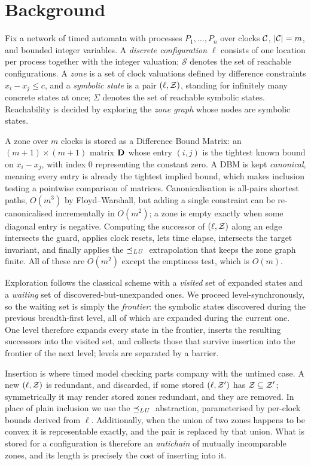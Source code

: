 \section{Background}\label{sec:bg}

Fix a network of timed automata with processes $P_1,\dots,P_n$ over clocks $\mathcal{C}$,
$|\mathcal{C}| = m$, and bounded integer variables. A \emph{discrete configuration} $\ell$
consists of one location per process together with the integer valuation; $\mathcal{S}$
denotes the set of reachable configurations. A \emph{zone} is a set of clock valuations
defined by difference constraints $x_i - x_j \le c$, and a \emph{symbolic state} is a pair
$(\ell,\mathcal{Z})$, standing for infinitely many concrete states at once; $\Sigma$ denotes the set
of reachable symbolic states. Reachability is decided by exploring the \emph{zone graph} whose
nodes are symbolic states.

A zone over $m$ clocks is stored as a Difference Bound Matrix: an $(m{+}1) \times (m{+}1)$
matrix $\mathbf{D}_{}$ whose entry $(i,j)$ is the tightest known bound on $x_i - x_j$, with index $0$
representing the constant zero. A DBM is kept \emph{canonical}, meaning every entry is already
the tightest implied bound, which makes inclusion testing a pointwise comparison of matrices.
Canonicalisation is all-pairs shortest paths, $O(m^3)$ by Floyd--Warshall, but adding a single
constraint can be re-canonicalised incrementally in $O(m^2)$; a zone is empty exactly when
some diagonal entry is negative. Computing the successor of $(\ell,\mathcal{Z})$ along an edge
intersects the guard, applies clock resets, lets time elapse, intersects the target
invariant, and finally applies the $\preceq_{\mathit{LU}}{}$ extrapolation that keeps the zone graph finite.
All of these are $O(m^2)$ except the emptiness test, which is $O(m)$.

Exploration follows the classical scheme with a \emph{visited} set of expanded states and a
\emph{waiting} set of discovered-but-unexpanded ones. We proceed level-synchronously, so the
waiting set is simply the \emph{frontier}: the symbolic states discovered during the previous
breadth-first level, all of which are expanded during the current one. One level therefore
expands every state in the frontier, inserts the resulting successors into the visited set,
and collects those that survive insertion into the frontier of the next level; levels are
separated by a barrier.

Insertion is where timed model checking parts company with the untimed case. A new
$(\ell,\mathcal{Z})$ is redundant, and discarded, if some stored $(\ell,\mathcal{Z}')$ has
$\mathcal{Z} \subseteq \mathcal{Z}'$; symmetrically it may render stored zones redundant, and they are
removed. In place of plain inclusion we use the $\preceq_{\mathit{LU}}{}$ abstraction, parameterised by
per-clock bounds derived from $\ell$. Additionally, when the union of two zones happens to be
convex it is representable exactly, and the pair is replaced by that union. What is stored for
a configuration is therefore an \emph{antichain} of mutually incomparable zones, and its
length is precisely the cost of inserting into it.

